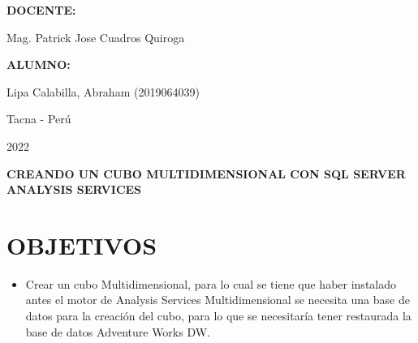 \documentclass[12pt,letterpaper]{article}
\begin{document}
\begin{titlepage}
\begin{center}
\begin{large}
        \end{large}
        \vspace*{0.2in}
        \begin{Large}
            \textbf{DOCENTE:} \\
        \end{Large}
        \vspace*{0.1in}
        \begin{large}
            Mag. Patrick Jose Cuadros Quiroga\\
        \end{large}
        \vspace*{0.3in}
        \begin{large}
            \textbf{ALUMNO:} \\
            \begin{flushleft}
                Lipa Calabilla, Abraham  		\hfill	(2019064039) \\
            \end{flushleft}
        \end{large}
        \vspace*{1.3in}
        \begin{large}
            Tacna - Perú\\
        \end{large}
        \vspace*{0.1in}
        \begin{large}
            2022\\
        \end{large}
    \end{center}
\end{titlepage}

\newpage
\tableofcontents
\justify
\newpage
\begin{LARGE}
    \begin{center}
        \textbf{CREANDO UN CUBO MULTIDIMENSIONAL CON SQL SERVER ANALYSIS SERVICES} \\
    \end{center}
\end{LARGE}
\section{OBJETIVOS}
\begin{itemize}
    \item Crear un cubo Multidimensional, para lo cual se tiene que haber instalado antes el motor de Analysis Services Multidimensional se necesita una base de datos para la creación del cubo, para lo que se necesitaría tener restaurada la base de datos Adventure Works DW.
\end{itemize}
\end{document}
